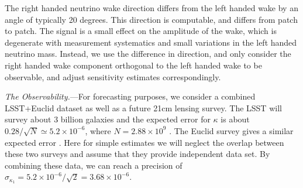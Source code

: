 \documentclass[aps,prl,twocolumn,showpacs,superscriptaddress,groupedaddress,nofootinbib]{revtex4}  %
\newcommand{\eV}{\ensuremath{\,{\rm eV}}}
\newcommand{\nur}{\ensuremath{{\nu_R~}}}
\newcommand{\nul}{\ensuremath{{\nu_L~}}}
\begin{document}
The right handed neutrino wake direction differs from the left handed
wake by an angle of typically 20 degrees.  This direction is
computable, and differs from patch to patch.  The signal is a small
effect on the amplitude of the wake, which is degenerate with
measurement systematics and small variations in the left handed
neutrino mass.  Instead, we use the difference in direction, and only
consider the right handed wake component orthogonal to the left handed
wake to be observable, and adjust sensitivity estimates correspondingly.









{\it The Observability.}---For forecasting purposes, 
we consider a combined LSST+Euclid dataset
as well as a future 21cm lensing survey. The LSST will survey about 3 billion
galaxies and the expected error for $\kappa$ is about
$0.28/\sqrt{N}\simeq5.2\times10^{-6}$, where
$N=2.88\times10^9$ \cite{Abell:2009}. The Euclid survey 
gives a similar expected error \cite{Laureijs:2011}\cite{Amendola:2012}. 
Here for simple estimates we will neglect the overlap between
these two surveys and assume that they provide independent data set. 
By combining these data, we can reach a precision of
$\sigma_{\kappa_1}=5.2\times10^{-6}/\sqrt{2}=3.68\times10^{-6}$.
\end{document}

